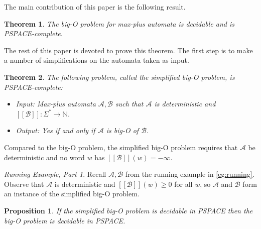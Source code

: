 \documentclass[10pt,a4paper]{amsart}
\newtheorem{thm}{Theorem}[section]
\newtheorem{prop}[prop]{Proposition}
\theoremstyle{definition}
\numberwithin{equation}{section}
\theoremstyle{remark}
\newcommand{\N}{\mathbb{N}}
\newcommand{\autA}{\mathcal{A}}
\newcommand{\autB}{\mathcal{B}}
\newcommand{\brfunc}[1]{[\![#1]\!]}
\newcommand{\funcB}{\brfunc{\autB}}
\theoremstyle{remark}
\newtheorem{runningexample/}{Running Example, Part}
\newenvironment{runningexample}
  {\renewcommand{\qedsymbol}{\color{darkgray}\ensuremath{\lrcorner}}%
   \pushQED{\qed}\begin{runningexample/}}
  {\popQED\end{runningexample/}}
\begin{document}
The main contribution of this paper is the following result.

\begin{thm}\label{thm:main}
The big-O problem for max-plus automata is decidable and is PSPACE-complete.
\end{thm}

The rest of this paper is devoted to prove this theorem. The first step is to make a number of simplifications on the automata taken as input.

\begin{thm}\label{thm:main-simplified}
The following problem, called the \emph{simplified big-O problem}, is PSPACE-complete: 
\begin{itemize}
\item Input: Max-plus automata $\autA,\autB$ such that $\autA$ is deterministic and $\funcB:\Sigma^* \to \N$.
\item Output: Yes if and only if $\autA$ is big-O of $\autB$.
\end{itemize}
\end{thm}
Compared to the big-O problem, the simplified big-O problem requires that $\autA$ be deterministic and no word $w$ has $\funcB(w) = -\infty$. 

\begin{runningexample}
Recall $\autA,\autB$ from the running example in \cref{eg:running}. Observe that $\autA$ is deterministic and $\funcB(w) \ge 0$ for all $w$, so $\autA$ and $\autB$ form an instance of the simplified big-O problem.
\end{runningexample}

\begin{prop}\label{prop:tosimplified}
If the simplified big-O problem is decidable in PSPACE then the big-O problem is decidable in PSPACE.
\end{prop}
\end{document}
